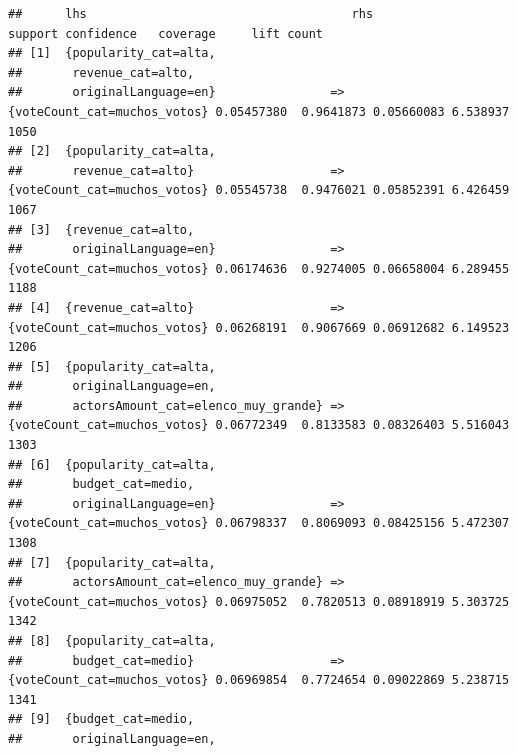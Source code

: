 \documentclass[
]{article}
\begin{document}
\begin{verbatim}
##      lhs                                     rhs                             support confidence   coverage     lift count
## [1]  {popularity_cat=alta,                                                                                               
##       revenue_cat=alto,                                                                                                  
##       originalLanguage=en}                => {voteCount_cat=muchos_votos} 0.05457380  0.9641873 0.05660083 6.538937  1050
## [2]  {popularity_cat=alta,                                                                                               
##       revenue_cat=alto}                   => {voteCount_cat=muchos_votos} 0.05545738  0.9476021 0.05852391 6.426459  1067
## [3]  {revenue_cat=alto,                                                                                                  
##       originalLanguage=en}                => {voteCount_cat=muchos_votos} 0.06174636  0.9274005 0.06658004 6.289455  1188
## [4]  {revenue_cat=alto}                   => {voteCount_cat=muchos_votos} 0.06268191  0.9067669 0.06912682 6.149523  1206
## [5]  {popularity_cat=alta,                                                                                               
##       originalLanguage=en,                                                                                               
##       actorsAmount_cat=elenco_muy_grande} => {voteCount_cat=muchos_votos} 0.06772349  0.8133583 0.08326403 5.516043  1303
## [6]  {popularity_cat=alta,                                                                                               
##       budget_cat=medio,                                                                                                  
##       originalLanguage=en}                => {voteCount_cat=muchos_votos} 0.06798337  0.8069093 0.08425156 5.472307  1308
## [7]  {popularity_cat=alta,                                                                                               
##       actorsAmount_cat=elenco_muy_grande} => {voteCount_cat=muchos_votos} 0.06975052  0.7820513 0.08918919 5.303725  1342
## [8]  {popularity_cat=alta,                                                                                               
##       budget_cat=medio}                   => {voteCount_cat=muchos_votos} 0.06969854  0.7724654 0.09022869 5.238715  1341
## [9]  {budget_cat=medio,                                                                                                  
##       originalLanguage=en,                                                                                               

\end{verbatim}
\end{document}
